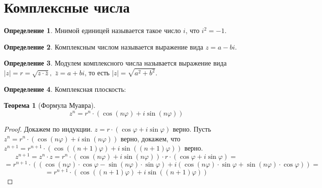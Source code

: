 \documentclass[12pt]{article}
\theoremstyle{definition}
\newtheorem{theorem}{Теорема}[section]
\newtheorem{definition}{Определение}
\begin{document}
    \section{Комплексные числа}
    \begin{definition}
        Мнимой единицей называется такое число $i$, что $i^2=-1$.
    \end{definition}
    \begin{definition}
        Комплексным числом называется выражение вида $z=a-bi$.
    \end{definition}
    \begin{definition}
        Модулем комплексного числа называется выражение вида $|z|=r=\sqrt{z\cdot\bar{z}},$ $\bar{z}=a+bi$, то есть $|z|=\sqrt{a^2+b^2}$.
    \end{definition}
    \begin{definition}
        Комплексная плоскость:
        \begin{center}
        \end{center}
    \end{definition}
    \begin{theorem}[Формула Муавра]
        $$z^n=r^n\cdot(\cos(n\varphi)+i\sin(n\varphi))$$
    \end{theorem}
    \begin{proof}
        Докажем по индукции. $z=r\cdot(\cos\varphi+ i\sin\varphi)$ верно. Пусть $z^n=r^n\cdot(\cos(n\varphi)+i\sin(n\varphi))$ верно, докажем, что $z^{n+1}=r^{n+1}\cdot(\cos((n+1)\varphi)+i\sin((n+1)\varphi))$ верно.
        $$z^{n+1}=z^n\cdot z=r^n\cdot(\cos(n\varphi)+i\sin(n\varphi))\cdot r\cdot(\cos\varphi+ i\sin\varphi)=$$
        $$=r^{n+1}\cdot((\cos(n\varphi)\cdot\cos\varphi-\sin(n\varphi)\cdot\sin\varphi)+i(\cos(n\varphi)\cdot\sin\varphi+\sin(n\varphi)\cdot\cos\varphi))=$$
        $$=r^{n+1}\cdot(\cos((n+1)\varphi)+i\sin((n+1)\varphi))$$
    \end{proof}
\end{document}
